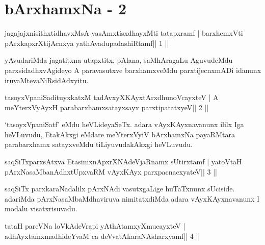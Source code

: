 \chapter{bArxhamxNa - 2}


\begin{shl}
jagajajxnisithxtidhavxMsA yasAmxtisxdhayxMti tatapxramf |
barxhemxVti pArxkapxrXtijAcnxya yathAvadupadashiRtamf\hfill || 1 ||
\end{shl}

\begin{artha}
yAvudariMda jagatitxna utapxtitx, pAlana, saMhAragaLu AguvudeMdu
parxsidadhxvAgideyo A paravasutxve barxhamxveMdu parxtijecnxmADi
idanunx iruvaMte\break vaNiRsidAdxyitu.
\end{artha}

\begin{shl}
tasoyxVpaniSadituyxkatxM tadAvxyXKAyx\s tArxdhunoVcayxteV |
A meYterxVyAyxH parabarxhamxsatayxsayx parxtipatatxyeV\hfill || 2 ||
\end{shl}

\begin{artha}
`tasoyxVpaniSatf' eMdu heVLideyaSeTx. adara vAyxKAyxnavanunx ililx Iga heVLuvudu, EtakAkxgi eMdare meYterxVyiV bArxhamxNa payaRMtara parabarxhamx satayxveMdu tiLiyuvudakAkxgi heVLuvudu.
\end{artha}




\begin{shl}
saqSiTxparxsAtxva EtasimxnApxrXNAdeVjaRnamx sUtirxtamf |
yatoV\s taH pArxNasaMbanAdhxtUpxvaRM vAyxKAyx parxpacnacxyateV\hfill || 3 ||
\end{shl}

\begin{artha}
saqSiTx parxkaraNadalilx pArxNAdi vasutxgaLige huTaTxnunx sUciside. adariMda pArxNasaMbaMdhaviruva nimitatxdiMda adara vAyxKAyxnavanunx I modalu visatxrisuvadu.
\end{artha}

\begin{shl}
tataH pareVNa loVkAdeVrapi yAthAtamxyXmucayxteV |
adhAyxtamxmadhideYvaM ca deVvatAkaraNAsharxyamf\hfill || 4 ||
\end{shl}

